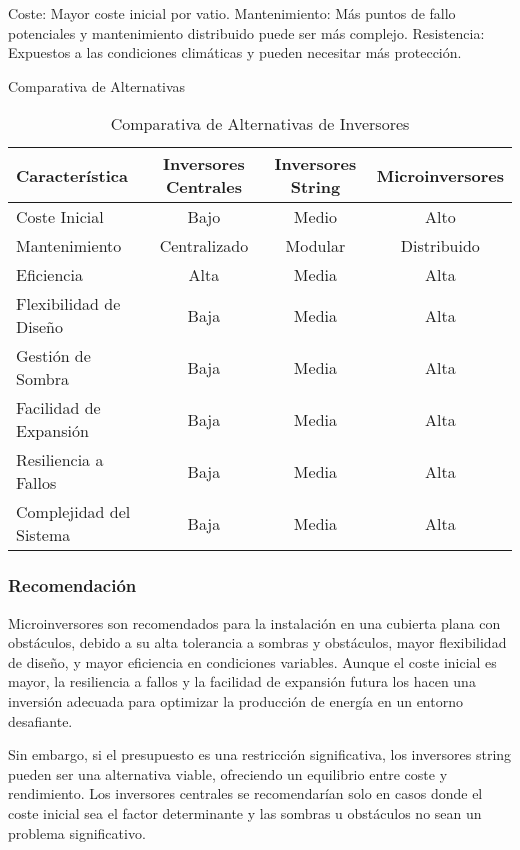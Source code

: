 \documentclass{article}
\begin{document}
Coste: Mayor coste inicial por vatio.
Mantenimiento: Más puntos de fallo potenciales y mantenimiento distribuido puede ser más complejo.
Resistencia: Expuestos a las condiciones climáticas y pueden necesitar más protección.

Comparativa de Alternativas


\begin{table}[h]
\centering
\begin{tabular}{lccc}
\toprule
\textbf{Característica} & \textbf{Inversores Centrales} & \textbf{Inversores String} & \textbf{Microinversores} \\
\midrule
Coste Inicial & Bajo & Medio & Alto \\
Mantenimiento & Centralizado & Modular & Distribuido \\
Eficiencia & Alta & Media & Alta \\
Flexibilidad de Diseño & Baja & Media & Alta \\
Gestión de Sombra & Baja & Media & Alta \\
Facilidad de Expansión & Baja & Media & Alta \\
Resiliencia a Fallos & Baja & Media & Alta \\
Complejidad del Sistema & Baja & Media & Alta \\
\bottomrule
\end{tabular}
\caption{Comparativa de Alternativas de Inversores}
\label{tab:comparativa_inversores}
\end{table}


\subsubsection*{Recomendación}
Microinversores son recomendados para la instalación en una cubierta plana con obstáculos, debido a su alta tolerancia a sombras y obstáculos, mayor flexibilidad de diseño, y mayor eficiencia en condiciones variables. Aunque el coste inicial es mayor, la resiliencia a fallos y la facilidad de expansión futura los hacen una inversión adecuada para optimizar la producción de energía en un entorno desafiante.

Sin embargo, si el presupuesto es una restricción significativa, los inversores string pueden ser una alternativa viable, ofreciendo un equilibrio entre coste y rendimiento. Los inversores centrales se recomendarían solo en casos donde el coste inicial sea el factor determinante y las sombras u obstáculos no sean un problema significativo.




\end{document}
